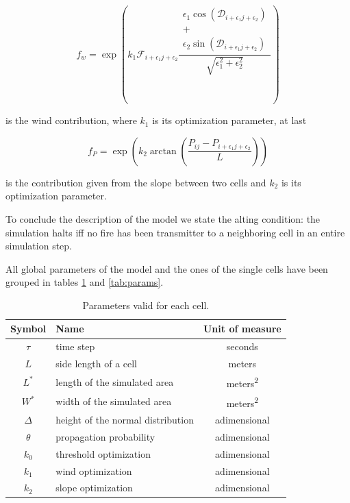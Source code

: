 \documentclass[Lau]{sapthesis} %
\newcommand{\e}{\epsilon}
\begin{document}
\begin{equation}\label{eq:wind}
f_w = \exp\left(k_1 \mathcal{F}_{i+\e_1j+\e_2}\frac{\begin{array}{c}\e_1\cos(\mathcal{D}_{i+\e_1j+\e_2})\\
      +\\\e_2\sin(\mathcal{D}_{i+\e_1j+\e_2})\end{array}}{\sqrt{\e_1^2 + \e_2^2}}\right)
\end{equation}

is the wind contribution, where $k_1$ is its optimization parameter, at last

\begin{equation}\label{eq:slope}
f_P = \exp\left(k_2\arctan\left(\frac{P_{ij}-P_{i+\e_1j+\e_2}}{L}\right)\right)
\end{equation}

is the contribution given from the slope between two cells and $k_2$ is its
optimization parameter.

To conclude the description of the model we state the alting condition: the
simulation halts iff no fire has been transmitter to a neighboring cell in an
entire simulation step.

All global parameters of the model and the ones of the single cells have been
grouped in tables \ref{tab:globals} and \ref{tab:params}.

\begin{table}
\centering
\begin{tabular}{|c|l|c|}
	\hline
	\textbf{Symbol} & \textbf{Name} & \textbf{Unit of measure}\\
	\hline
	$\tau$ & time step & seconds\\
	$L$ & side length of a cell & meters\\
	$L^*$ & length of the simulated area & meters\textsuperscript{2}\\
	$W^*$ & width of the simulated area & meters\textsuperscript{2}\\
	$\Delta$ & height of the normal distribution & adimensional\\
	$\theta$ & propagation probability & adimensional\\
	$k_0$ & threshold optimization & adimensional\\
	$k_1$ & wind optimization & adimensional\\
	$k_2$ & slope optimization & adimensional\\
	\hline
\end{tabular}
\caption{Parameters valid for each cell.}
\label{tab:globals}
\end{table}
\end{document}
